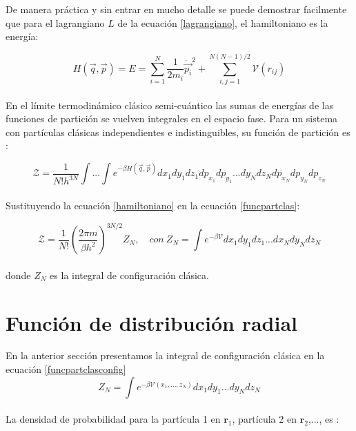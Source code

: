 De manera práctica y sin entrar en mucho detalle se puede demostrar facilmente que para el lagrangiano $L$ de la ecuación \ref{lagrangiano}, el hamiltoniano es la energía:

\begin{equation} \label{hamiltoniano}
    H(\vec{q},\vec{p}) = E = \sum_{i=1}^{N} \frac{1}{2 m_i}\dot{\vec{p_i}}^2 + \sum_{i,j=1}^{N(N-1)/2} \mathcal{V}(r_{ij})
\end{equation}\\

En el límite termodinámico clásico semi-cuántico las sumas de energías de las funciones de partición se vuelven integrales en el espacio fase. Para un sistema con partículas clásicas independientes e indistinguibles, su función de partición es \cite{mcquarrie1976}:

\begin{equation} \label{funcpartclas}
    \mathcal{Z} = \frac{1}{N!h^{3N}}\int ...\int e^{-\beta H(\vec{q},\vec{p})}dx_1dy_1dz_1dp_{x_1}dp_{y_1}...dy_N dz_Ndp_{x_N}dp_{y_N}dp_{z_N}
\end{equation}\\

Sustituyendo la ecuación \ref{hamiltoniano} en la ecuación \ref{funcpartclas}\cite{feynman1972statistical}:

\begin{equation} \label{funcpartclasconfig}
    \mathcal{Z} = \frac{1}{N!}\left( \frac{2\pi m}{\beta h^2} \right)^{3N/2}Z_N,\quad con\ Z_N = \int e^{-\beta \mathcal{V}}dx_1dy_1dz_1...dx_N dy_N dz_N
\end{equation}\\

donde $Z_N$ es la integral de configuración clásica.

\section{Función de distribución radial}

En la anterior sección presentamos la integral de configuración clásica en la ecuación \ref{funcpartclasconfig}\\

\begin{equation} \label{intconfclas}
    Z_N = \int e^{-\beta \mathcal{V}(x_1,...,z_N)}dx_1dy_1...dy_N dz_N
\end{equation}\\

La densidad de probabilidad para la partícula 1 en $\mathbf{r}_1$, partícula 2 en $\mathbf{r}_2$,..., es \cite{feynman1972statistical}:\\

